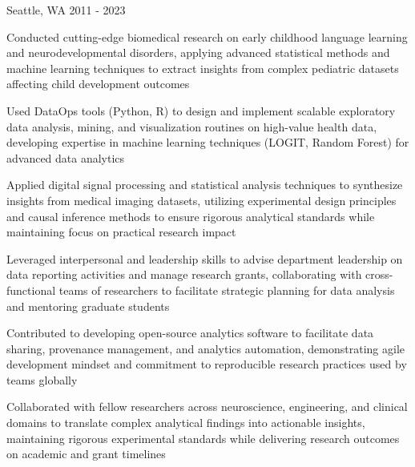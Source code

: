 \begin{cventries}
  {Seattle, WA} %
  {2011 - 2023} %
  {
    \begin{cvitems} %
      \vspace{2mm}
      \item Conducted cutting-edge biomedical research on early childhood language learning and neurodevelopmental disorders, applying advanced statistical methods and machine learning techniques to extract insights from complex pediatric datasets affecting child development outcomes
      \item Used DataOps tools (Python, R) to design and implement scalable exploratory data analysis, mining, and visualization routines on high-value health data, developing expertise in machine learning techniques (LOGIT, Random Forest) for advanced data analytics
      \item Applied digital signal processing and statistical analysis techniques to synthesize insights from medical imaging datasets, utilizing experimental design principles and causal inference methods to ensure rigorous analytical standards while maintaining focus on practical research impact
      \item Leveraged interpersonal and leadership skills to advise department leadership on data reporting activities and manage research grants, collaborating with cross-functional teams of researchers to facilitate strategic planning for data analysis and mentoring graduate students
      \item Contributed to developing open-source analytics software to facilitate data sharing, provenance management, and analytics automation, demonstrating agile development mindset and commitment to reproducible research practices used by teams globally
      \item Collaborated with fellow researchers across neuroscience, engineering, and clinical domains to translate complex analytical findings into actionable insights, maintaining rigorous experimental standards while delivering research outcomes on academic and grant timelines
    \end{cvitems}
    \vspace{2mm}
  }


\end{cventries}
